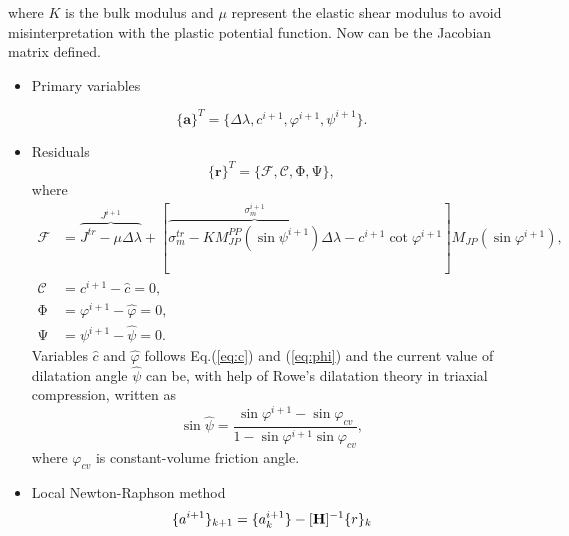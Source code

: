 where $K$ is the bulk modulus and $\mu$ represent the elastic shear modulus to avoid misinterpretation with the plastic potential function. Now can be the Jacobian matrix defined.

\begin{itemize}
	\item Primary variables
	
	\begin{equation}
		\lbrace \mathbf{a} \rbrace ^T = \lbrace \Delta \lambda, c^{i+1}, \varphi^{i+1}, \psi^{i+1} \rbrace.
	\end{equation}
	
	\item Residuals
	\begin{equation}
		\lbrace \mathbf{r} \rbrace^T =  \lbrace \mathcal{F}, \mathcal{C}, \mathrm{\Phi}, \mathrm{\Psi} \rbrace,
	\end{equation}
	where \begin{align}
		\mathcal{F} &= \overbrace{J^{tr}-\mu\Delta\lambda}^{J^{i+1}} + [\overbrace{\sigma_m^{tr}-K M_{JP}^{PP}(\sin \psi^{i+1})\Delta\lambda}^{\sigma_m^{i+1}}-c^{i+1}\cot\varphi^{i+1}]M_{JP}(\sin\varphi^{i+1}),\label{eq:f_yc_lam}\\
		\mathcal{C} &= c^{i+1} - \hat{c} = 0,\label{eq:C_jac}\\
		\mathrm{\Phi} &= \varphi^{i+1} - \hat{\varphi} = 0,\label{eq:phi_jac}\\
		\mathrm{\Psi} &= \psi^{i+1} - \hat{\psi} = 0.
	\end{align}
	Variables $\hat{c}$ and $\hat{\varphi}$ follows Eq.(\ref{eq:c}) and (\ref{eq:phi}) and the current value of dilatation angle $\hat{\psi}$ can be, with help of Rowe's dilatation theory in triaxial compression, written as
	\begin{equation}
		\sin \hat{\psi} = \dfrac{\sin \varphi^{i+1} - \sin \varphi_{cv}}{1 - \sin \varphi^{i+1} \sin \varphi_{cv}},
	\end{equation}
	where $\varphi_{cv}$ is constant-volume friction angle.
	
	\item Local Newton-Raphson method
	\begin{equation}\label{eq:newton_raphson}
		\lbrace a^{i+1} \rbrace _{k+1} = \lbrace a^{i+1}_k \rbrace - [\text{\textbf{H}}]^{-1} \lbrace r \rbrace_k 
	\end{equation}
	

\end{itemize}
